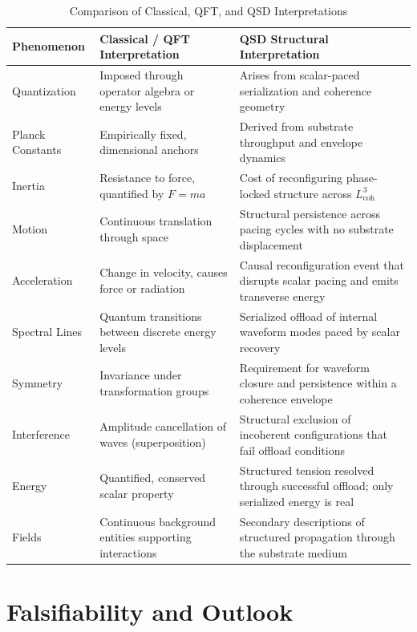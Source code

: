 \documentclass[entropy,article,submit,pdftex,oneauthor]{Definitions/mdpi}
\begin{document}
\begin{table}[H]
\centering
\caption{Comparison of Classical, QFT, and QSD Interpretations}
\label{fig:compare}
\begin{tabular}{|p{2.8cm}|p{3.5cm}|p{6.0cm}|}
\hline
\textbf{Phenomenon} & \textbf{Classical / QFT Interpretation} & \textbf{QSD Structural Interpretation} \\
\hline
Quantization & Imposed through operator algebra or energy levels & Arises from scalar-paced serialization and coherence geometry \\
\hline
Planck Constants & Empirically fixed, dimensional anchors & Derived from substrate throughput and envelope dynamics \\
\hline
Inertia & Resistance to force, quantified by \( F = ma \) & Cost of reconfiguring phase-locked structure across \( L_{\text{coh}}^3 \) \\
\hline
Motion & Continuous translation through space & Structural persistence across pacing cycles with no substrate displacement \\
\hline
Acceleration & Change in velocity, causes force or radiation & Causal reconfiguration event that disrupts scalar pacing and emits transverse energy \\
\hline
Spectral Lines & Quantum transitions between discrete energy levels & Serialized offload of internal waveform modes paced by scalar recovery \\
\hline
Symmetry & Invariance under transformation groups & Requirement for waveform closure and persistence within a coherence envelope \\
\hline
Interference & Amplitude cancellation of waves (superposition) & Structural exclusion of incoherent configurations that fail offload conditions \\
\hline
Energy & Quantified, conserved scalar property & Structured tension resolved through successful offload; only serialized energy is real \\
\hline
Fields & Continuous background entities supporting interactions & Secondary descriptions of structured propagation through the substrate medium \\
\hline
\end{tabular}
\end{table}


\section*{Falsifiability and Outlook}
\end{document}
